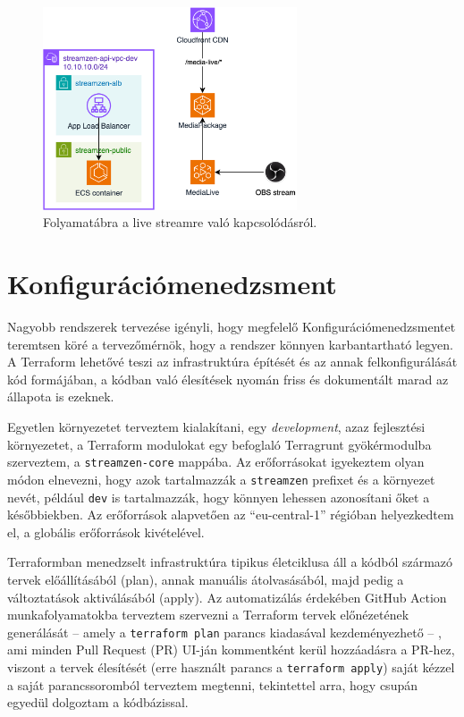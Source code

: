 \begin{figure}[ht]
	\centering
	\includegraphics[height=60mm, keepaspectratio]{figures/dipterv_live2.png}
	\caption{Folyamatábra a live streamre való kapcsolódásról.}
	\label{fig:live2}
\end{figure}

\section{Konfigurációmenedzsment}

Nagyobb rendszerek tervezése igényli, hogy megfelelő Konfigurációmenedzsmentet teremtsen köré a tervezőmérnök, hogy a rendszer könnyen karbantartható legyen. A Terraform lehetővé teszi az infrastruktúra építését és az annak felkonfigurálását kód formájában, a kódban való élesítések nyomán friss és dokumentált marad az állapota is ezeknek.

Egyetlen környezetet terveztem kialakítani, egy \emph{development}, azaz fejlesztési környezetet, a Terraform modulokat egy befoglaló Terragrunt gyökérmodulba szerveztem, a \verb|streamzen-core| mappába. Az erőforrásokat igyekeztem olyan módon elnevezni, hogy azok tartalmazzák a \verb|streamzen| prefixet és a környezet nevét, például \verb|dev| is tartalmazzák, hogy könnyen lehessen azonosítani őket a későbbiekben. Az erőforrások alapvetően az ``eu-central-1'' régióban helyezkedtem el, a globális erőforrások kivételével.

Terraformban menedzselt infrastruktúra tipikus életciklusa áll a kódból származó tervek előállításából (plan), annak manuális átolvasásából, majd pedig a változtatások aktiválásából (apply). Az automatizálás érdekében GitHub Action munkafolyamatokba terveztem szervezni a Terraform tervek előnézetének generálását -- amely a \verb|terraform plan| parancs kiadasával kezdeményezhető -- , ami minden Pull Request (PR) UI-ján kommentként kerül hozzáadásra a PR-hez, viszont a tervek élesítését (erre használt parancs a \verb|terraform apply|) saját kézzel a saját parancssoromból terveztem megtenni, tekintettel arra, hogy csupán egyedül dolgoztam a kódbázissal.

